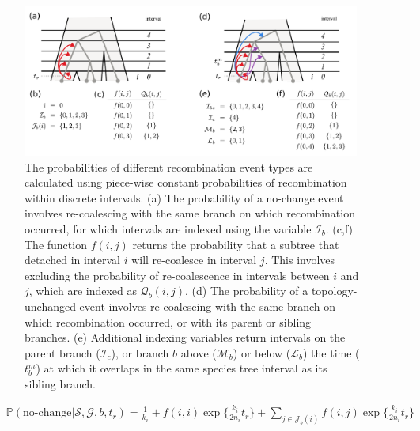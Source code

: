 \documentclass[11pt]{article}
\begin{document}
\begin{figure}[t]
	\centering
	\includegraphics[width=0.99\textwidth]{figures/interval-functions}
	\caption{
		The probabilities of different recombination event types are calculated using 
		piece-wise constant probabilities of recombination within discrete intervals.
		(a) The probability of a no-change event involves re-coalescing with the same 
		branch on which recombination occurred, for which intervals are indexed using
		the variable $\mathcal{I}_b$.
		(c,f) The function $f(i,j)$ returns the probability that a subtree that detached 
		in interval $i$ will re-coalesce in interval $j$. This involves excluding
		the probability of re-coalescence in intervals between $i$ and $j$, which are 
		indexed as $\mathcal{Q}_b(i,j)$. 
		(d) The probability of a topology-unchanged event involves re-coalescing with the 
		same branch on which recombination occurred, or with its parent or sibling branches. 
		(e) Additional indexing variables return intervals on the parent branch 
		($\mathcal{I}_c$), or branch $b$ above ($\mathcal{M}_b$) or below 
		($\mathcal{L}_b$) the time ($t_b^m$) at which it overlaps in the same species tree interval 
		as its sibling branch.
	}
	\label{fig:fig3}
\end{figure}


\begin{equation}
\begin{aligned}
	&\mathbb{P}(\text{no-change} | \mathcal{S},\mathcal{G},b,t_r) = 
	\frac{1}{k_i} + 
	f(i,i) \exp \bigg\{ \frac{k_i}{2n_i} t_r \bigg\} +
	\sum_{j \in \mathcal{J}_b(i)} f(i,j) \exp \bigg\{ \frac{k_i}{2n_i} t_r\bigg\}
\end{aligned}
\end{equation}
\end{document}

